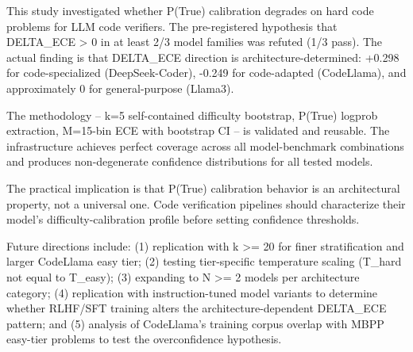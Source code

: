 
This study investigated whether P(True) calibration degrades on hard code problems for LLM code verifiers. The pre-registered hypothesis that DELTA\_ECE > 0 in at least 2/3 model families was refuted (1/3 pass). The actual finding is that DELTA\_ECE direction is architecture-determined: +0.298 for code-specialized (DeepSeek-Coder), -0.249 for code-adapted (CodeLlama), and approximately 0 for general-purpose (Llama3).

The methodology -- k=5 self-contained difficulty bootstrap, P(True) logprob extraction, M=15-bin ECE with bootstrap CI -- is validated and reusable. The infrastructure achieves perfect coverage across all model-benchmark combinations and produces non-degenerate confidence distributions for all tested models.

The practical implication is that P(True) calibration behavior is an architectural property, not a universal one. Code verification pipelines should characterize their model's difficulty-calibration profile before setting confidence thresholds.

Future directions include: (1) replication with k >= 20 for finer stratification and larger CodeLlama easy tier; (2) testing tier-specific temperature scaling (T\_hard not equal to T\_easy); (3) expanding to N >= 2 models per architecture category; (4) replication with instruction-tuned model variants to determine whether RLHF/SFT training alters the architecture-dependent DELTA\_ECE pattern; and (5) analysis of CodeLlama's training corpus overlap with MBPP easy-tier problems to test the overconfidence hypothesis.
